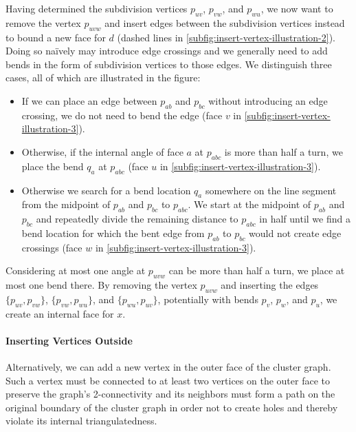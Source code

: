 Having determined the subdivision vertices $p_{uv}$, $p_{vw}$, and $p_{wu}$, we now want to remove the vertex $p_{uvw}$ and insert edges between the subdivision vertices instead to bound a new face for $d$ (dashed lines in \cref{subfig:insert-vertex-illustration-2}). Doing so naïvely may introduce edge crossings and we generally need to add bends in the form of subdivision vertices to those edges. We distinguish three cases, all of which are illustrated in the figure:
%
\begin{itemize}
	\item If we can place an edge between $p_{ab}$ and $p_{bc}$ without introducing an edge crossing, we do not need to bend the edge (face $v$ in \cref{subfig:insert-vertex-illustration-3}).
	\item Otherwise, if the internal angle of face $a$ at $p_{abc}$ is more than half a turn, we place the bend $q_a$ at $p_{abc}$ (face $u$ in \cref{subfig:insert-vertex-illustration-3}).
	\item Otherwise we search for a bend location $q_a$ somewhere on the line segment from the midpoint of $p_{ab}$ and $p_{bc}$ to $p_{abc}$. We start at the midpoint of $p_{ab}$ and $p_{bc}$ and repeatedly divide the remaining distance to $p_{abc}$ in half until we find a bend location for which the bent edge from $p_{ab}$ to $p_{bc}$ would not create edge crossings (face $w$ in \cref{subfig:insert-vertex-illustration-3}).
\end{itemize}

Considering at most one angle at $p_{uvw}$ can be more than half a turn, we place at most one bend there. By removing the vertex $p_{uvw}$ and inserting the edges $\{p_{uv},p_{vw}\}$, $\{p_{vw},p_{wu}\}$, and $\{p_{wu},p_{uv}\}$, potentially with bends $p_v$, $p_w$, and $p_u$, we create an internal face for $x$.



\paragraph{Inserting Vertices Outside}


Alternatively, we can add a new vertex in the outer face of the cluster graph. Such a vertex must be connected to at least two vertices on the outer face to preserve the graph's 2-connectivity and its neighbors must form a path on the original boundary of the cluster graph in order not to create holes and thereby violate its internal triangulatedness.

